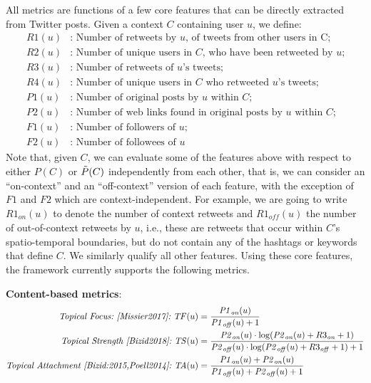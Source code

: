 All metrics are functions of a few core features that can be directly extracted from Twitter posts. 
Given a context $C$ containing user $u$, we define:
%
\begin{align*}
\mathit{R1}(u) &\text{: Number of retweets by $u$, of tweets from other users in C;}\\
\mathit{R2}(u)&\text{: Number of unique users in $C$, who have been retweeted by $u$;}\\
\mathit{R3}(u)&\text{: Number of retweets of $u$'s tweets;}\\
\mathit{R4}(u)&\text{: Number of unique users in $C$ who retweeted $u$'s tweets;}\\
\mathit{P1}(u)&\text{: Number of original posts by $u$ within $C$;}\\
\mathit{P2}(u)&\text{: Number of web links found in original posts by $u$ within $C$;} \\
\mathit{F1}(u)& \text{: Number of followers of $u$;}\\
\mathit{F2}(u)& \text{: Number of followees of $u$}
\end{align*}
%
Note that, given $C$, we can evaluate some of the features above with respect to either $P(C)$ or  $\Tilde{P}(C)$ independently from each other, that is, we can consider an ``on-context'' and an ``off-context'' version of each feature, with the exception of $\mathit{F1}$ and $\mathit{F2}$ which are context-independent.
%
For example, we are going to write $R1_{on}(u)$ to denote the number of context retweets and $R1_{\mathit{off}}(u)$ the number of out-of-context retweets by $u$, i.e., these are retweets that occur within $C$'s spatio-temporal boundaries, but do not contain any of the hashtags or keywords that define $C$.  
%
We similarly qualify all other features.
%
Using these core features, the framework currently supports the following metrics.

\textbf{Content-based metrics}:
\begin{align}
\textit{Topical Focus:~\cite{Missier2017}:} ~ \mathit{TF}(u) & =  \frac{\mathit{P1}_{\mathit{on}}(u)}{\mathit{P1}_{\mathit{off}}(u) +1}    \label{eq:TF}\\
\textit{Topical Strength~\cite{Bizid2018}:} ~\mathit{TS}(u) & =	\frac{\mathit{P2}_{\mathit{on}}(u) \cdot \log(\mathit{P2}_{\mathit{on}}(u) + R3_{\mathit{on}} +1 )}{\mathit{P2}_{\mathit{off}}(u) \cdot \log(\mathit{P2}_{\mathit{off}}(u) + R3_{\mathit{off}} +1 ) + 1}   \label{eq:TS} \\
\textit{Topical Attachment~\cite{Bizid:2015,Poell2014}:} ~\mathit{TA}(u) & = \frac{\mathit{P1}_{\mathit{on}}(u) + \mathit{P2}_{\mathit{on}}(u)}{\mathit{P1}_{\mathit{off}}(u) + \mathit{P2}_{\mathit{off}}(u) +1} \label{eq:TA}
\end{align}

